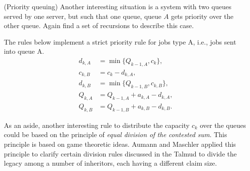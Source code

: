   \begin{question} (Priority queuing) Another interesting situation is
    a system with two queues served by one server, but such that one
    queue, queue $A$ gets priority over the other
    queue. Again find a set of recursions to describe this case.

    \begin{solution}
      The rules below implement a strict priority rule for jobs type
      A, i.e., jobs sent into queue A.
\begin{equation*}
  \begin{split}
    d_{k,A} &= \min\{Q_{k-1, A}, c_k\}, \\
    c_{k,B} &= c_k - d_{k,A}, \\
    d_{k,B} &= \min\{Q_{k-1, B}, c_{k,B}\}, \\
    Q_{k,A} &= Q_{k-1, A} + a_{k,A} - d_{k,A}, \\
    Q_{k,B} &= Q_{k-1, B} + a_{k,B} - d_{k,B}.
  \end{split}
\end{equation*}

As an aside, another interesting rule to distribute the capacity $c_k$
over the queues could be based on the principle of \textit{ equal
  division of the contested sum}. This principle is based on game
theoretic ideas. Aumann and Maschler applied this principle to clarify
certain division rules discussed in the Talmud to divide the legacy
among a number of inheritors, each having a different claim size.
    \end{solution}
\end{question}



